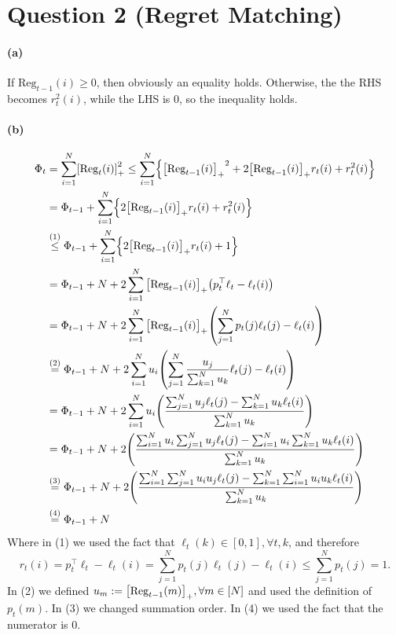 \documentclass{article}
\DeclarePairedDelimiter\br{(}{)}%
\DeclarePairedDelimiter\brs{[}{]}%
\DeclarePairedDelimiter\brc{\{}{\}}%
\newcommand{\Reg}{\text{Reg}}
\newcommand{\RegPlus}[1]{{ \brs*{\Reg_{t-1}(#1)}_{+} }}
\begin{document}
\section{Question 2 (Regret Matching)}

\paragraph{(a)}
If $\Reg_{t-1}(i) \geq 0$, then obviously an equality holds.
Otherwise, the the RHS becomes $r^2_t(i)$, while the LHS is $0$, so the inequality holds.


\paragraph{(b)}
\begin{align*} 
\Phi_t & = \sum_{i=1}^N  \brs*{\Reg_t(i)}_{+}^2 \leq  \sum_{i=1}^N \brc*{  \RegPlus{i}^2 + 2  \RegPlus{i} r_t(i) + r^2_t(i) }\\
& =  \Phi_{t-1} +  \sum_{i=1}^N  \brc*{ 2 \brs*{\Reg_{t-1}(i)}_{+} r_t(i)   + r^2_t(i) }\\
\ & \stackrel{(1)}{\leq}  \Phi_{t-1} +  \sum_{i=1}^N  \brc*{ 2  \RegPlus{i} r_t(i)   + 1 }\\
\ & =  \Phi_{t-1} +  N  + 2\sum_{i=1}^N     \RegPlus{i} \br*{p_t^\top\ell_t-\ell_t(i)}   \\
\ & =  \Phi_{t-1} +  N  + 2\sum_{i=1}^N     \RegPlus{i} \br*{ \sum_{j=1}^N p_t(j) \ell_t(j) -\ell_t(i)}   \\
\ & \stackrel{(2)}{=} \Phi_{t-1} +  N  + 2\sum_{i=1}^N     u_i \br*{ \sum_{j=1}^N  \frac{ u_j}{ \sum_{k=1}^N u_k} \ell_t(j) -\ell_t(i)}   \\
& = \Phi_{t-1} +  N + 2\sum_{i=1}^N u_i \br*{\frac{\sum_{j=1}^N   u_j \ell_t(j)  - \sum_{k=1}^N u_k \ell_t(i)}{\sum_{k=1}^N u_k}} \\
& = \Phi_{t-1} +  N + 2 \br*{\frac{\sum_{i=1}^N u_i \sum_{j=1}^N   u_j \ell_t(j)  - \sum_{i=1}^N u_i \sum_{k=1}^N u_k \ell_t(i)}{\sum_{k=1}^N u_k}}\\
& \stackrel{(3)}{=} \Phi_{t-1} +  N + 2 \br*{\frac{\sum_{i=1}^N \sum_{j=1}^N   u_i  u_j \ell_t(j)  -  \sum_{k=1}^N \sum_{i=1}^N u_i u_k \ell_t(i)}{\sum_{k=1}^N u_k}} \\
& \stackrel{(4)}{=} \Phi_{t-1} +  N 
\end{align*}
Where in (1) we used the fact that $\ell_t(k) \in [0,1], \forall t,k$, and therefore
\begin{equation*}
    r_t(i)=p_t^\top\ell_t-\ell_t(i) = \sum_{j=1}^{N}p_t(j)\ell_t(j)  - \ell_t(i) \leq \sum_{j=1}^{N}p_t(j) = 1.
\end{equation*}
In  (2) we defined $u_m := \RegPlus{m}, \forall m \in [N]$ and used the definition of $p_t(m)$.
In (3) we changed summation order.
In (4) we used the fact that the numerator is $0$.
\end{document}
